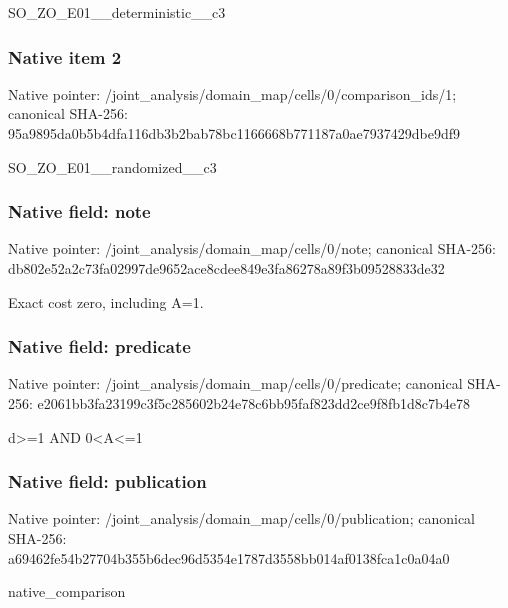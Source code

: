 \documentclass[10pt,a4paper]{article}
\begin{document}
\begingroup\raggedright\sloppy SO\_\allowbreak{}ZO\_\allowbreak{}E01\_\allowbreak{}\_\allowbreak{}deterministic\_\allowbreak{}\_\allowbreak{}c3\par\endgroup

\subsubsection{Native item 2}
Native pointer: /joint\_\allowbreak{}analysis/domain\_\allowbreak{}map/cells/0/comparison\_\allowbreak{}ids/1; canonical SHA-256: 95a9895da0b5b4dfa116db3b2bab78bc1166668b771187a0ae7937429dbe9df9

\begingroup\raggedright\sloppy SO\_\allowbreak{}ZO\_\allowbreak{}E01\_\allowbreak{}\_\allowbreak{}randomized\_\allowbreak{}\_\allowbreak{}c3\par\endgroup

\subsubsection{Native field: note}
Native pointer: /joint\_\allowbreak{}analysis/domain\_\allowbreak{}map/cells/0/note; canonical SHA-256: db802e52a2c73fa02997de9652ace8cdee849e3fa86278a89f3b09528833de32

\begingroup\raggedright\sloppy Exact cost zero,\allowbreak{} including A=\allowbreak{}1.\par\endgroup

\subsubsection{Native field: predicate}
Native pointer: /joint\_\allowbreak{}analysis/domain\_\allowbreak{}map/cells/0/predicate; canonical SHA-256: e2061bb3fa23199c3f5c285602b24e78c6bb95faf823dd2ce9f8fb1d8c7b4e78

\begingroup\raggedright\sloppy d>=\allowbreak{}1 AND 0<A<=\allowbreak{}1\par\endgroup

\subsubsection{Native field: publication}
Native pointer: /joint\_\allowbreak{}analysis/domain\_\allowbreak{}map/cells/0/publication; canonical SHA-256: a69462fe54b27704b355b6dec96d5354e1787d3558bb014af0138fca1c0a04a0

\begingroup\raggedright\sloppy native\_\allowbreak{}comparison\par\endgroup
\end{document}
